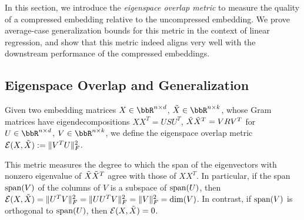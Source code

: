 %	


In this section, we introduce the \textit{eigenspace overlap metric} to measure the quality of a compressed embedding relative to the uncompressed embedding.
We prove average-case generalization bounds for this metric in the context of linear regression, and show that this metric indeed aligns very well with the downstream performance of the compressed embeddings.

\subsection{Eigenspace Overlap and Generalization}
\label{subsec:eigen_overlap}
\begin{definition}
Given two embedding matrices $X \in \RR^{n \times d}$, $\tX \in \RR^{n \times k}$, whose Gram matrices have eigendecompositions $XX^T = USU^T$, $\tX\tX^T = VRV^T$ for $U \in \RR^{n\times d}$, $V\in \RR^{n \times k}$, we define the eigenspace overlap metric $\eigover(X,\tX) \defeq  \|V^T U\|_F^2$.
\end{definition}

This metric measures the degree to which the span of the eigenvectors with nonzero eigenvalue of $\tX\tX^T$ agree with those of $XX^T$.
In particular, if the span $\Span(V)$ of the columns of $V$ is a subspace of $\Span(U)$, then $\eigover(X,\tX) =\|U^T V\|_F^2 = \|UU^T V\|_F^2 = \|V\|_F^2 = \dim(V)$.
In contrast, if $\Span(V)$ is orthogonal to $\Span(U)$, then $\eigover(X,\tX) = 0$.

